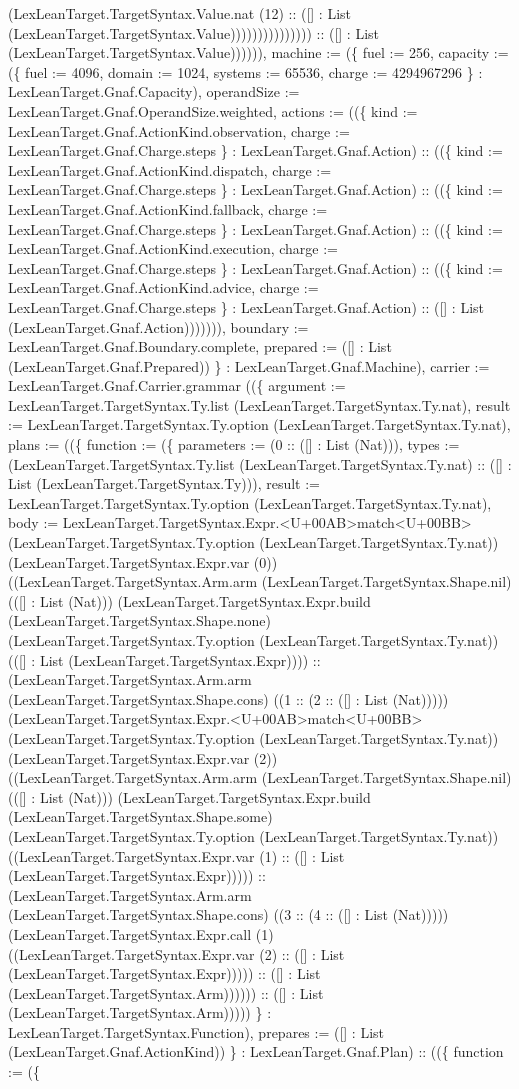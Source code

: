 \documentclass[11pt]{article}
\begin{document}
(LexLeanTarget.TargetSyntax.Value.nat (12) :: ([] : List (LexLeanTarget.TargetSyntax.Value))))))))))))))) :: ([] : List (LexLeanTarget.TargetSyntax.Value)))))), machine := (\{ fuel := 256, capacity := (\{ fuel := 4096, domain := 1024, systems := 65536, charge := 4294967296 \} : LexLeanTarget.Gnaf.Capacity), operandSize := LexLeanTarget.Gnaf.OperandSize.weighted, actions := ((\{ kind := LexLeanTarget.Gnaf.ActionKind.observation, charge := LexLeanTarget.Gnaf.Charge.steps \} : LexLeanTarget.Gnaf.Action) :: ((\{ kind := LexLeanTarget.Gnaf.ActionKind.dispatch, charge := LexLeanTarget.Gnaf.Charge.steps \} : LexLeanTarget.Gnaf.Action) :: ((\{ kind := LexLeanTarget.Gnaf.ActionKind.fallback, charge := LexLeanTarget.Gnaf.Charge.steps \} : LexLeanTarget.Gnaf.Action) :: ((\{ kind := LexLeanTarget.Gnaf.ActionKind.execution, charge := LexLeanTarget.Gnaf.Charge.steps \} : LexLeanTarget.Gnaf.Action) :: ((\{ kind := LexLeanTarget.Gnaf.ActionKind.advice, charge := LexLeanTarget.Gnaf.Charge.steps \} : LexLeanTarget.Gnaf.Action) :: ([] : List (LexLeanTarget.Gnaf.Action))))))), boundary := LexLeanTarget.Gnaf.Boundary.complete, prepared := ([] : List (LexLeanTarget.Gnaf.Prepared)) \} : LexLeanTarget.Gnaf.Machine), carrier := LexLeanTarget.Gnaf.Carrier.grammar ((\{ argument := LexLeanTarget.TargetSyntax.Ty.list (LexLeanTarget.TargetSyntax.Ty.nat), result := LexLeanTarget.TargetSyntax.Ty.option (LexLeanTarget.TargetSyntax.Ty.nat), plans := ((\{ function := (\{ parameters := (0 :: ([] : List (Nat))), types := (LexLeanTarget.TargetSyntax.Ty.list (LexLeanTarget.TargetSyntax.Ty.nat) :: ([] : List (LexLeanTarget.TargetSyntax.Ty))), result := LexLeanTarget.TargetSyntax.Ty.option (LexLeanTarget.TargetSyntax.Ty.nat), body := LexLeanTarget.TargetSyntax.Expr.<U+00AB>match<U+00BB> (LexLeanTarget.TargetSyntax.Ty.option (LexLeanTarget.TargetSyntax.Ty.nat)) (LexLeanTarget.TargetSyntax.Expr.var (0)) ((LexLeanTarget.TargetSyntax.Arm.arm (LexLeanTarget.TargetSyntax.Shape.nil) (([] : List (Nat))) (LexLeanTarget.TargetSyntax.Expr.build (LexLeanTarget.TargetSyntax.Shape.none) (LexLeanTarget.TargetSyntax.Ty.option (LexLeanTarget.TargetSyntax.Ty.nat)) (([] : List (LexLeanTarget.TargetSyntax.Expr)))) :: (LexLeanTarget.TargetSyntax.Arm.arm (LexLeanTarget.TargetSyntax.Shape.cons) ((1 :: (2 :: ([] : List (Nat))))) (LexLeanTarget.TargetSyntax.Expr.<U+00AB>match<U+00BB> (LexLeanTarget.TargetSyntax.Ty.option (LexLeanTarget.TargetSyntax.Ty.nat)) (LexLeanTarget.TargetSyntax.Expr.var (2)) ((LexLeanTarget.TargetSyntax.Arm.arm (LexLeanTarget.TargetSyntax.Shape.nil) (([] : List (Nat))) (LexLeanTarget.TargetSyntax.Expr.build (LexLeanTarget.TargetSyntax.Shape.some) (LexLeanTarget.TargetSyntax.Ty.option (LexLeanTarget.TargetSyntax.Ty.nat)) ((LexLeanTarget.TargetSyntax.Expr.var (1) :: ([] : List (LexLeanTarget.TargetSyntax.Expr))))) :: (LexLeanTarget.TargetSyntax.Arm.arm (LexLeanTarget.TargetSyntax.Shape.cons) ((3 :: (4 :: ([] : List (Nat))))) (LexLeanTarget.TargetSyntax.Expr.call (1) ((LexLeanTarget.TargetSyntax.Expr.var (2) :: ([] : List (LexLeanTarget.TargetSyntax.Expr))))) :: ([] : List (LexLeanTarget.TargetSyntax.Arm)))))) :: ([] : List (LexLeanTarget.TargetSyntax.Arm))))) \} : LexLeanTarget.TargetSyntax.Function), prepares := ([] : List (LexLeanTarget.Gnaf.ActionKind)) \} : LexLeanTarget.Gnaf.Plan) :: ((\{ function := (\{ 
\end{document}
